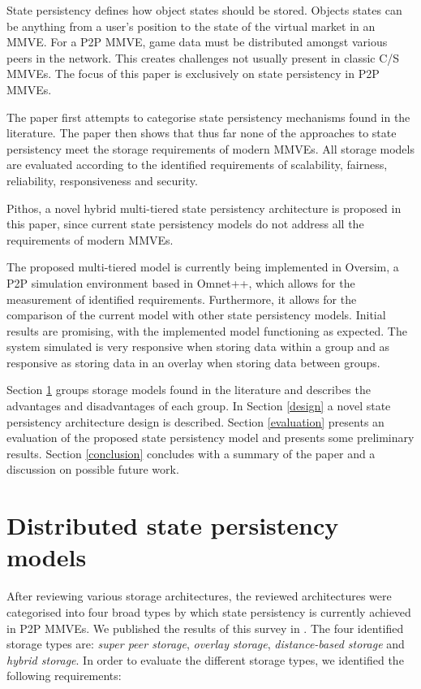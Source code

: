 \documentclass[10pt,a4paper,conference]{IEEEtran}
\begin{document}
State persistency defines how object states should be stored. Objects states can be anything from a user's position to the state of the virtual
market in an MMVE. For a P2P MMVE, game data must be distributed amongst various peers in the network. This creates challenges not usually present in
classic C/S MMVEs. The focus of this paper is exclusively on state persistency in P2P MMVEs.

The paper first attempts to categorise state persistency mechanisms found in the literature. The paper then shows that thus far none of the
approaches to state persistency meet the storage requirements of modern MMVEs. All storage models are evaluated according to the identified
requirements of scalability, fairness, reliability, responsiveness and security.

Pithos, a novel hybrid multi-tiered state persistency architecture is proposed in this paper, since current state persistency models do not address
all the requirements of modern MMVEs.

The proposed multi-tiered model is currently being implemented in Oversim, a P2P simulation environment based in Omnet++, which allows for the
measurement of identified requirements. Furthermore, it allows for the comparison of the current model with other state persistency models. Initial
results are promising, with the implemented model functioning as expected. The system simulated is very responsive when storing data within a group
and as responsive as storing data in an overlay when storing data between groups.

Section \ref{current_models} groups storage models found in the literature and describes the advantages and disadvantages of each group.
%
In Section \ref{design} a novel state persistency architecture design is described.
%
Section \ref{evaluation} presents an evaluation of the proposed state persistency model and presents some preliminary results.
%
Section \ref{conclusion} concludes with a summary of the paper and a discussion on possible future work.

\section{Distributed state persistency models}
\label{current_models}

After reviewing various storage architectures, the reviewed architectures were categorised into four broad types by which state persistency is currently achieved
in P2P MMVEs. We published the results of this survey in \cite{gilmore_p2p_mmog_state_persistency}. The four identified storage types are: \emph{super peer storage}, \emph{overlay storage}, \emph{distance-based storage} and \emph{hybrid storage}. In order to evaluate the different storage types, we identified the following requirements:
\end{document}
